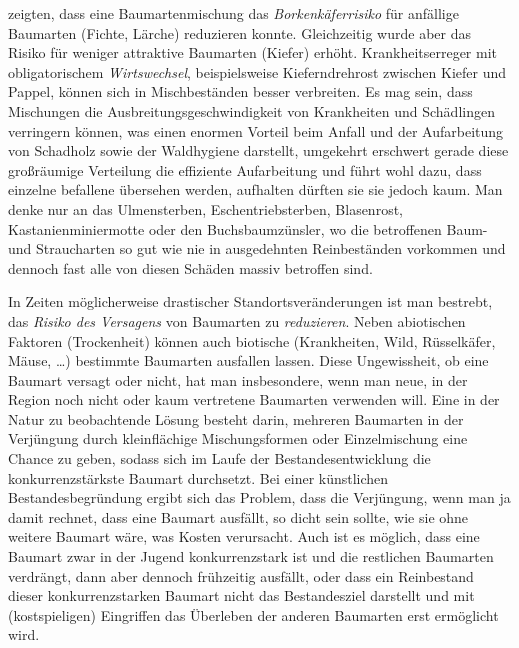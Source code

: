 \documentclass[twocolumn, paper=a4, fontsize=10pt, bibliography=totoc, index=totoc]{scrartcl}
\begin{document}
\citet{sylvie2021mischwaldInsekten} zeigten, dass eine
Baumartenmischung das \emph{Borkenkäferrisiko} für anfällige Baumarten
(Fichte, Lärche) reduzieren konnte. Gleichzeitig wurde aber das Risiko
für weniger attraktive Baumarten (Kiefer) erhöht. Krankheitserreger
mit obligatorischem \emph{Wirtswechsel}, beispielsweise
Kieferndrehrost zwischen Kiefer und Pappel, können sich in
Mischbeständen besser verbreiten. Es mag sein, dass Mischungen die Ausbreitungsgeschwindigkeit von Krankheiten und Schädlingen verringern können, was einen enormen Vorteil beim Anfall und der Aufarbeitung von Schadholz sowie der Waldhygiene darstellt, umgekehrt erschwert gerade diese großräumige Verteilung die effiziente Aufarbeitung und führt wohl dazu, dass einzelne befallene übersehen werden, aufhalten dürften sie sie jedoch kaum. Man denke nur an das Ulmensterben, Eschentriebsterben, Blasenrost, Kastanienminiermotte oder den Buchsbaumzünsler, wo die betroffenen Baum- und Straucharten so gut wie nie in ausgedehnten Reinbeständen vorkommen und dennoch fast alle von diesen Schäden massiv betroffen sind.

In Zeiten möglicherweise drastischer Standortsveränderungen ist man bestrebt,
das \emph{Risiko des Versagens} von Baumarten zu \emph{reduzieren}. Neben
abiotischen Faktoren (Trockenheit) können auch biotische (Krankheiten, Wild,
Rüsselkäfer, Mäuse, \dots) bestimmte Baumarten ausfallen lassen. Diese
Ungewissheit, ob eine Baumart versagt oder nicht, hat man insbesondere, wenn man
neue, in der Region noch nicht oder kaum vertretene Baumarten verwenden will.
Eine in der Natur zu beobachtende Lösung besteht darin, mehreren Baumarten
in der Verjüngung durch kleinflächige Mischungsformen oder Einzelmischung eine Chance
zu geben, sodass sich im Laufe der Bestandesentwicklung die konkurrenzstärkste 
Baumart durchsetzt.
Bei einer künstlichen Bestandesbegründung ergibt sich das Problem,
dass die Verjüngung, wenn man ja damit rechnet, dass eine Baumart ausfällt, so
dicht sein sollte, wie sie ohne weitere Baumart wäre, was Kosten verursacht.
Auch ist es möglich, dass eine Baumart zwar in der Jugend konkurrenzstark ist
und die restlichen Baumarten verdrängt, dann aber dennoch frühzeitig ausfällt,
oder dass ein Reinbestand dieser konkurrenzstarken Baumart nicht das
Bestandesziel darstellt und mit (kostspieligen) Eingriffen das Überleben der
anderen Baumarten erst ermöglicht wird.
\end{document}
